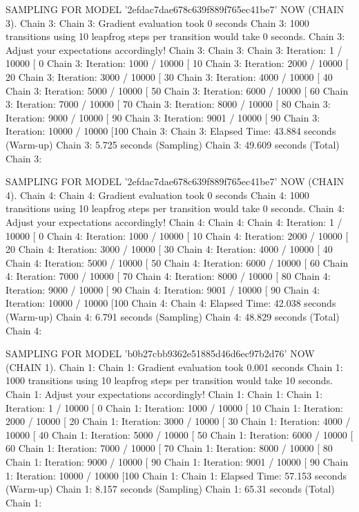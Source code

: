 \documentclass[
]{jss}
\begin{document}
\begin{CodeChunk}
\begin{CodeOutput}
SAMPLING FOR MODEL '2efdac7dae678c639f889f765ec41be7' NOW (CHAIN 3).
Chain 3: 
Chain 3: Gradient evaluation took 0 seconds
Chain 3: 1000 transitions using 10 leapfrog steps per transition would take 0 seconds.
Chain 3: Adjust your expectations accordingly!
Chain 3: 
Chain 3: 
Chain 3: Iteration:    1 / 10000 [  0%
Chain 3: Iteration: 1000 / 10000 [ 10%
Chain 3: Iteration: 2000 / 10000 [ 20%
Chain 3: Iteration: 3000 / 10000 [ 30%
Chain 3: Iteration: 4000 / 10000 [ 40%
Chain 3: Iteration: 5000 / 10000 [ 50%
Chain 3: Iteration: 6000 / 10000 [ 60%
Chain 3: Iteration: 7000 / 10000 [ 70%
Chain 3: Iteration: 8000 / 10000 [ 80%
Chain 3: Iteration: 9000 / 10000 [ 90%
Chain 3: Iteration: 9001 / 10000 [ 90%
Chain 3: Iteration: 10000 / 10000 [100%
Chain 3: 
Chain 3:  Elapsed Time: 43.884 seconds (Warm-up)
Chain 3:                5.725 seconds (Sampling)
Chain 3:                49.609 seconds (Total)
Chain 3: 

SAMPLING FOR MODEL '2efdac7dae678c639f889f765ec41be7' NOW (CHAIN 4).
Chain 4: 
Chain 4: Gradient evaluation took 0 seconds
Chain 4: 1000 transitions using 10 leapfrog steps per transition would take 0 seconds.
Chain 4: Adjust your expectations accordingly!
Chain 4: 
Chain 4: 
Chain 4: Iteration:    1 / 10000 [  0%
Chain 4: Iteration: 1000 / 10000 [ 10%
Chain 4: Iteration: 2000 / 10000 [ 20%
Chain 4: Iteration: 3000 / 10000 [ 30%
Chain 4: Iteration: 4000 / 10000 [ 40%
Chain 4: Iteration: 5000 / 10000 [ 50%
Chain 4: Iteration: 6000 / 10000 [ 60%
Chain 4: Iteration: 7000 / 10000 [ 70%
Chain 4: Iteration: 8000 / 10000 [ 80%
Chain 4: Iteration: 9000 / 10000 [ 90%
Chain 4: Iteration: 9001 / 10000 [ 90%
Chain 4: Iteration: 10000 / 10000 [100%
Chain 4: 
Chain 4:  Elapsed Time: 42.038 seconds (Warm-up)
Chain 4:                6.791 seconds (Sampling)
Chain 4:                48.829 seconds (Total)
Chain 4: 

SAMPLING FOR MODEL 'b0b27cbb9362e51885d46d6ec97b2d76' NOW (CHAIN 1).
Chain 1: 
Chain 1: Gradient evaluation took 0.001 seconds
Chain 1: 1000 transitions using 10 leapfrog steps per transition would take 10 seconds.
Chain 1: Adjust your expectations accordingly!
Chain 1: 
Chain 1: 
Chain 1: Iteration:    1 / 10000 [  0%
Chain 1: Iteration: 1000 / 10000 [ 10%
Chain 1: Iteration: 2000 / 10000 [ 20%
Chain 1: Iteration: 3000 / 10000 [ 30%
Chain 1: Iteration: 4000 / 10000 [ 40%
Chain 1: Iteration: 5000 / 10000 [ 50%
Chain 1: Iteration: 6000 / 10000 [ 60%
Chain 1: Iteration: 7000 / 10000 [ 70%
Chain 1: Iteration: 8000 / 10000 [ 80%
Chain 1: Iteration: 9000 / 10000 [ 90%
Chain 1: Iteration: 9001 / 10000 [ 90%
Chain 1: Iteration: 10000 / 10000 [100%
Chain 1: 
Chain 1:  Elapsed Time: 57.153 seconds (Warm-up)
Chain 1:                8.157 seconds (Sampling)
Chain 1:                65.31 seconds (Total)
Chain 1: 


\end{CodeOutput}
\end{CodeChunk}
\end{document}
